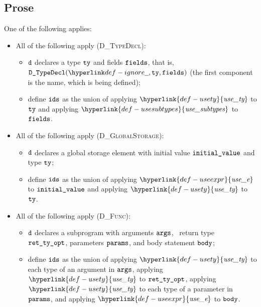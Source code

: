\documentclass{book}
\newcommand\usety[0]{\hyperlink{def-usety}{\textfunc{use\_ty}}}
\newcommand\usesubtypes[0]{\hyperlink{def-usesubtypes}{\textfunc{use\_subtypes}}}
\newcommand\useexpr[0]{\hyperlink{def-useexpr}{\textfunc{use\_e}}}
\begin{document}
\subsection{Prose}
One of the following applies:
\begin{itemize}
  \item All of the following apply (\textsc{D\_TypeDecl}):
  \begin{itemize}
    \item $\texttt{d}$ declares a type $\texttt{ty}$ and fields $\texttt{fields}$, that is,
          $\DTypeDecl(\Ignore, \tty, \fields)$ (the first component is the name, which is being defined);
    \item define $\texttt{ids}$ as the union of applying $\usety$ to $\texttt{ty}$ and applying $\usesubtypes$ to $\texttt{fields}$.
  \end{itemize}

  \item All of the following apply (\textsc{D\_GlobalStorage}):
  \begin{itemize}
    \item $\texttt{d}$ declares a global storage element with initial value $\texttt{initial\_value}$ and type $\texttt{ty}$;
    \item define $\texttt{ids}$ as the union of applying $\useexpr$ to $\texttt{initial\_value}$ and applying $\usety$ to $\texttt{ty}$.
  \end{itemize}

  \item All of the following apply (\textsc{D\_Func}):
  \begin{itemize}
    \item $\texttt{d}$ declares a subprogram with arguments $\texttt{args}$, \optional\ return type \\
          $\texttt{ret\_ty\_opt}$, parameters $\texttt{params}$, and body statement $\texttt{body}$;
    \item define $\texttt{ids}$ as the union of applying $\usety$ to each type of an argument in $\texttt{args}$,
          applying $\usety$ to $\texttt{ret\_ty\_opt}$, applying $\usety$ to each type of a parameter in $\texttt{params}$,
          and applying $\useexpr$ to $\texttt{body}$.
  \end{itemize}
\end{itemize}
\end{document}

